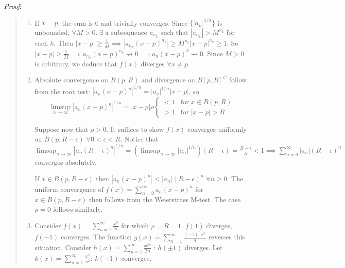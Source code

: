 \documentclass[11pt]{article}
\begin{document}
\emph{Proof}:
\begin{quote}\vspace{-0.3cm}
	\begin{enumerate}
	\item If $x = p$, the sum is 0 and trivially converges. Since $\{|a_n|^{1/n}\}$ is unbounded, $\forall M > 0.\; \exists$ a subsequence $a_{n_k}$ such that $|a_{n_k}| > M^{n_k}$ for each $k$. Then $|x-p| \geq \frac{1}{M} \implies |a_{n_k}(x-p)^{n_k}| \geq M^{n_k}|x-p|^{n_k} \geq 1$. So $|x-p| \geq \frac{1}{M} \implies a_{n_k} (x-p)^{n_k} \not \to 0 \implies a_n(x-p)^k \not \to 0$. Since $M > 0$ is arbitrary, we deduce that $f(x)$ diverges $\forall x \neq p$.

	\item Absolute convergence on $B(p, R)$ and divergence on $B[p,R]^C$ follow from the root test:
	$|a_n (x-p)^n|^{1/n} = |a_n|^{1/n} |x-p|$, so
	\begin{displaymath}
	\limsup_{n \to \infty} |a_n(x-p)^n|^{1/n} = |x-p| \rho
		\begin{cases}
		< 1 & \text{for } x \in B(p, R)\\
		> 1 & \text{for } |x-p| > R
		\end{cases}
	\end{displaymath}

	Suppose now that $\rho > 0$. It suffices to show $f(x)$ converges uniformly on $B(p, R-\epsilon)$ $\forall 0 < \epsilon < R$. Notice that $\limsup_{n \to \infty} |a_n(R-\epsilon)^n|^{1/n} = (\limsup_{n \to \infty} |a_n|^{1/n})(R - \epsilon) = \frac{R-\epsilon}{R} < 1 \implies \sum_{n=0}^\infty |a_n| (R-\epsilon)^n$ converges absolutely.

If $x \in B(p, R-\epsilon)$ then $|a_n(x-p)^n| \leq |a_n|(R-\epsilon)^n$ $\forall n \geq 0$. The uniform convergence of $f(x) = \sum_{n=0}^\infty a_n(x-p)^n$ for $x \in B(p, R-\epsilon)$ then follows from the Weierstrass M-test. The case $\rho = 0$ follows similarly.

	\item Consider $f(x) = \sum_{n=1}^\infty \frac{x^n}{n}$ for which $\rho = R = 1$. $f(1)$ diverges, $f(-1)$ converges. The function $g(x) = \sum_{n=1}^\infty \frac{(-1)^n x^n}{n}$ reverses this situation. Consider $h(x) = \sum_{n=1}^\infty \frac{x^{2n}}{2n}$ : $h(\pm 1)$ diverges. Let $k(x) = \sum_{n=1}^\infty \frac{x^n}{n^2}$: $k(\pm 1)$ converges.
	\end{enumerate}
\end{quote}
\end{document}
